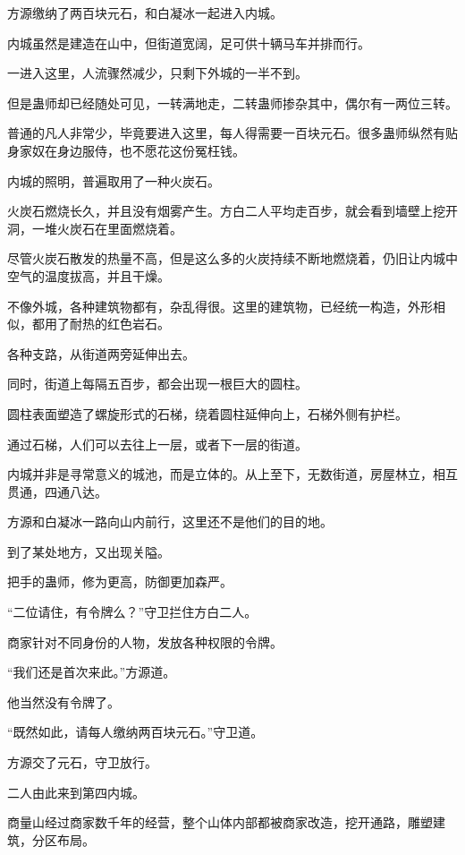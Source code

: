 
\begin{this_body}



方源缴纳了两百块元石，和白凝冰一起进入内城。

内城虽然是建造在山中，但街道宽阔，足可供十辆马车并排而行。

一进入这里，人流骤然减少，只剩下外城的一半不到。

但是蛊师却已经随处可见，一转满地走，二转蛊师掺杂其中，偶尔有一两位三转。

普通的凡人非常少，毕竟要进入这里，每人得需要一百块元石。很多蛊师纵然有贴身家奴在身边服侍，也不愿花这份冤枉钱。

内城的照明，普遍取用了一种火炭石。

火炭石燃烧长久，并且没有烟雾产生。方白二人平均走百步，就会看到墙壁上挖开洞，一堆火炭石在里面燃烧着。

尽管火炭石散发的热量不高，但是这么多的火炭持续不断地燃烧着，仍旧让内城中空气的温度拔高，并且干燥。

不像外城，各种建筑物都有，杂乱得很。这里的建筑物，已经统一构造，外形相似，都用了耐热的红色岩石。

各种支路，从街道两旁延伸出去。

同时，街道上每隔五百步，都会出现一根巨大的圆柱。

圆柱表面塑造了螺旋形式的石梯，绕着圆柱延伸向上，石梯外侧有护栏。

通过石梯，人们可以去往上一层，或者下一层的街道。

内城并非是寻常意义的城池，而是立体的。从上至下，无数街道，房屋林立，相互贯通，四通八达。

方源和白凝冰一路向山内前行，这里还不是他们的目的地。

到了某处地方，又出现关隘。

把手的蛊师，修为更高，防御更加森严。

“二位请住，有令牌么？”守卫拦住方白二人。

商家针对不同身份的人物，发放各种权限的令牌。

“我们还是首次来此。”方源道。

他当然没有令牌了。

“既然如此，请每人缴纳两百块元石。”守卫道。

方源交了元石，守卫放行。

二人由此来到第四内城。

商量山经过商家数千年的经营，整个山体内部都被商家改造，挖开通路，雕塑建筑，分区布局。


\end{this_body}
